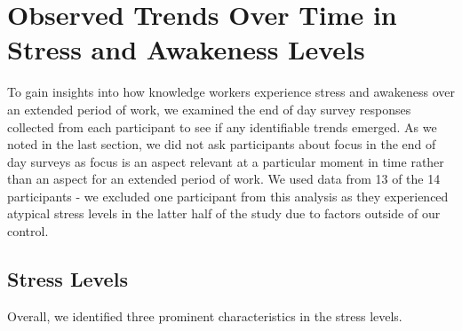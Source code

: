%



\section{Observed Trends Over Time in Stress and Awakeness Levels}
\label{stressTrends}

To gain insights into how knowledge workers experience stress and awakeness over an
extended period of work, we examined the end of day survey responses
collected from each participant to see if any identifiable trends
emerged. As we noted in the last section, we did not ask
participants about focus in the end of  day surveys as focus is an 
aspect relevant at a particular moment in time rather than an aspect
for an extended period of work. We used data from 13 of the 14 participants - we excluded one participant
from this analysis as they experienced atypical stress
levels in the latter half of the study due to factors outside of our
control.

\subsection{Stress Levels}
Overall, we identified three prominent characteristics in the stress levels.


